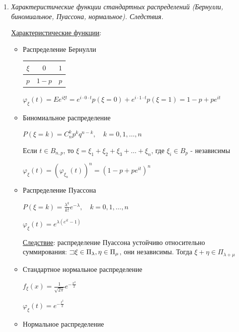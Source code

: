 \documentclass[12pt]{article}
\begin{document}
\begin{enumerate}
\begin{enumerate}
        $\{\xi_n\} \rightrightarrows \xi \Longleftrightarrow \varphi_{\xi_n}(t) \longrightarrow \varphi_\xi(t) \forall t \in \Real$
    \end{enumerate}

    \item \textit{Характеристические функции стандартных распределений (Бернулли, биномиальное, Пуассона, нормальное). Следствия.}

    \hyperlink{characteristicfunctionofstandarddistributions}{Характеристические функции}: 

    \begin{itemize}
        \item Распределение Бернулли

        \begin{tabular}{c|c|c}
            $\xi$ & $0$     & $1$    \\
            \hline
            $p$   & $1 - p$ & $p$
        \end{tabular} \qquad\qquad $\varphi_\xi(t) = Ee^{i\xi t} = e^{i \cdot 0 \cdot t} p(\xi = 0) + e^{i \cdot 1 \cdot t} p(\xi = 1) = 1 - p + p e^{it}$

        \item Биномиальное распределение

        $P(\xi = k) = C_n^k p^k q^{n - k}, \quad k = 0, 1, \dots, n$

        Если $t \in B_{n,p}$, то $\xi = \xi_1 + \xi_2 + \xi_3 + \dots + \xi_n$, где $\xi_i \in B_p$ - независимы

        $\varphi_\xi(t) = (\varphi_{\xi_n}(t))^n = (1 - p + p e^{it})^n$

        \item Распределение Пуассона

        $P(\xi = k) = \frac{\lambda^k}{k!} e^{-\lambda}, \quad k = 0, 1, \dots, n$

        $\varphi_\xi(t) = e^{\lambda (e^{it} - 1)}$

        \underline{Следствие}: распределение Пуассона устойчиво относительно суммирования: $\mathord{\sqsupset} \xi \in \Pi_\lambda, \eta \in \Pi_\mu$, они независимы. Тогда $\xi + \eta \in \Pi_{\lambda + \mu}$

        \item Стандартное нормальное распределение

        $f_\xi(x) = \frac{1}{\sqrt{2\pi}} e^{-\frac{x^2}{2}}$

        $\varphi_\xi(t) = e^{-\frac{t^2}{2}}$

        \item Нормальное распределение


\end{itemize}
\end{enumerate}
\end{document}
